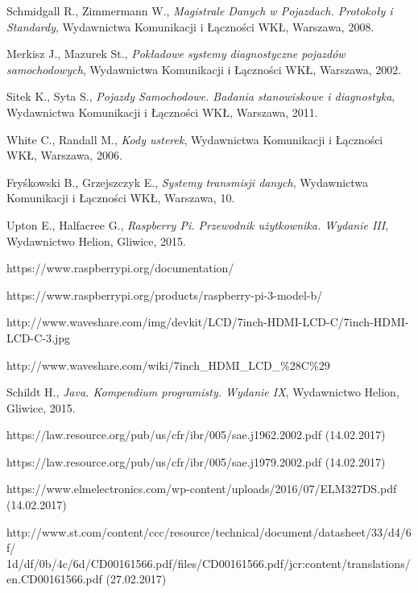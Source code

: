 \documentclass[12pt]{article} %
\numberwithin{equation}{subsection}
\numberwithin{figure}{section}
\numberwithin{table}{section}
\begin{document}
\begin{thebibliography}{99}

		Schmidgall R., Zimmermann W., \emph{Magistrale Danych w Pojazdach. Protokoły i Standardy}, Wydawnictwa Komunikacji i Łączności WKŁ, Warszawa, 2008.

		Merkisz J., Mazurek St., \emph{Pokładowe systemy diagnostyczne pojazdów samochodowych}, Wydawnictwa Komunikacji i Łączności WKŁ, Warszawa, 2002.		
		
		Sitek K., Syta S., \emph{Pojazdy Samochodowe. Badania stanowiskowe i diagnostyka}, Wydawnictwa Komunikacji i Łączności WKŁ, Warszawa, 2011.
		
		White C., Randall M., \emph{Kody usterek}, Wydawnictwa Komunikacji i Łączności WKŁ, Warszawa, 2006.
		
		Fryśkowski B., Grzejszczyk E., \emph{Systemy transmisji danych}, Wydawnictwa Komunikacji i Łączności WKŁ, Warszawa, 10.
		
		Upton E., Halfacree G., \emph{Raspberry Pi. Przewodnik użytkownika. Wydanie III}, Wydawnictwo Helion, Gliwice, 2015.
		
		https://www.raspberrypi.org/documentation/
		
		https://www.raspberrypi.org/products/raspberry-pi-3-model-b/
		
		http://www.waveshare.com/img/devkit/LCD/7inch-HDMI-LCD-C/7inch-HDMI-LCD-C-3.jpg
		
		http://www.waveshare.com/wiki/7inch\_HDMI\_LCD\_\%28C\%29	
	
		Schildt H., \emph{Java. Kompendium programisty. Wydanie IX}, Wydawnictwo Helion, Gliwice, 2015.
		
		https://law.resource.org/pub/us/cfr/ibr/005/sae.j1962.2002.pdf (14.02.2017)
		
		https://law.resource.org/pub/us/cfr/ibr/005/sae.j1979.2002.pdf (14.02.2017)
		
		https://www.elmelectronics.com/wp-content/uploads/2016/07/ELM327DS.pdf (14.02.2017)
		
		http://www.st.com/content/ccc/resource/technical/document/datasheet/33/d4/6f/
		1d/df/0b/4c/6d/CD00161566.pdf/files/CD00161566.pdf/jcr:content/translations/
		en.CD00161566.pdf (27.02.2017)
		

\end{thebibliography}
\end{document}

